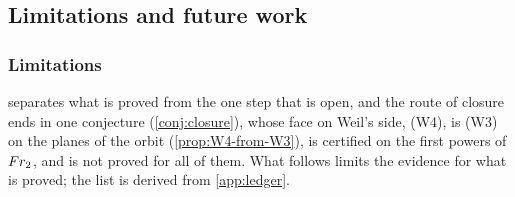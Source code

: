 \subsection{Limitations and future work}\label{sec:limits}

\subsubsection{Limitations}\label{sec:open}

 separates what is proved from the one step that is open, and
the route of closure ends in one conjecture (\cref{conj:closure}), whose face on Weil's side, (W4),
is \textup{(W3)} on the planes of the orbit (\cref{prop:W4-from-W3}), is certified on the first powers of $Fr_2$, and is not proved for all of them.  What follows limits the evidence for what
is proved; the list is derived from \cref{app:ledger}.

